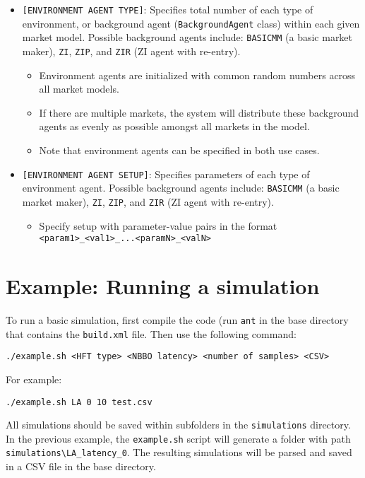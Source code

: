 \documentclass[11pt]{article}
\begin{document}
\begin{itemize}
\item \verb|[ENVIRONMENT AGENT TYPE]|: Specifies total number of each type of environment, or background agent (\verb|BackgroundAgent| class) within each given market model. Possible background agents include: \verb|BASICMM| (a basic market maker), \verb|ZI|, \verb|ZIP|, and \verb|ZIR| (ZI agent with re-entry).

\begin{itemize}
\item Environment agents are initialized with common random numbers across all market models.

\item If there are multiple markets, the system will distribute these background agents as evenly as possible amongst all markets in the model.

\item Note that environment agents can be specified in both use cases.

\end{itemize}

\item \verb|[ENVIRONMENT AGENT SETUP]|: Specifies parameters of each type of environment agent. Possible background agents include: \verb|BASICMM| (a basic market maker), \verb|ZI|, \verb|ZIP|, and \verb|ZIR| (ZI agent with re-entry).

\begin{itemize}
\item Specify setup with parameter-value pairs in the format \\
\verb|<param1>_<val1>_...<paramN>_<valN>|
\end{itemize}

\end{itemize}

\section{Example: Running a simulation}

To run a basic simulation, first compile the code (run \verb|ant| in the base directory that contains the \verb|build.xml| file. Then use the following command:
\begin{verbatim}
./example.sh <HFT type> <NBBO latency> <number of samples> <CSV>
\end{verbatim}
For example:
\begin{verbatim}
./example.sh LA 0 10 test.csv
\end{verbatim}



All simulations should be saved within subfolders in the \verb|simulations| directory.
In the previous example, the \verb|example.sh| script will generate a folder with path \verb|simulations\LA_latency_0|.
%
The resulting simulations will be parsed and saved in a CSV file in the base directory.
\end{document}
